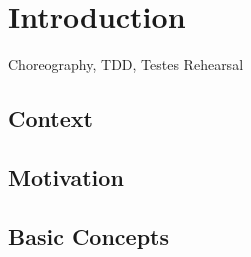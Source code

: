 \section{Introduction}

Choreography, TDD, Testes 
Rehearsal

\subsection{Context}

\subsection{Motivation}

\subsection{Basic Concepts}